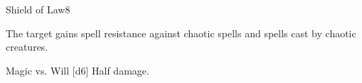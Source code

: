 \begin{spellsection}{Shield of Law}{8}
    \begin{spellheader}
    \end{spellheader}
    \begin{spellcontent}
        \begin{spelltargetinginfo}
        \end{spelltargetinginfo}
        \begin{spelleffects}
            \spelleffect The target gains spell resistance against chaotic spells and spells cast by chaotic creatures.
            \spelldur \durshort \dismissable
        \end{spelleffects}
    \end{spellcontent}
    \begin{spellsubcontent}
        \begin{spelltargetinginfo}
        \end{spelltargetinginfo}
        \begin{spelleffects}
            \begin{spellattack}{Magic vs. Will}
                \spellsuccess {}[d6]
                \spellfailure Half damage.
            \end{spellattack}
        \end{spelleffects}
    \end{spellsubcontent}
    \begin{spellfooter}
        \miscastexplode
    \end{spellfooter}
\end{spellsection}


